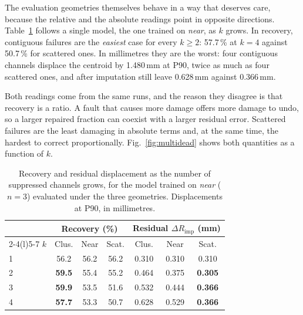 \documentclass[10pt,conference]{IEEEtran}
\begin{document}
The evaluation geometries themselves behave in a way that deserves care, because
the relative and the absolute readings point in opposite directions.
Table~\ref{tab:regimes-k} follows a single model, the one trained on
\emph{near}, as $k$ grows. In recovery, contiguous failures are the
\emph{easiest} case for every $k \ge 2$: 57.7\,\% at $k=4$ against 50.7\,\% for
scattered ones. In millimetres they are the worst: four contiguous channels
displace the centroid by 1.480\,mm at P90, twice as much as four scattered ones,
and after imputation still leave 0.628\,mm against 0.366\,mm.

Both readings come from the same runs, and the reason they disagree is that
recovery is a ratio. A fault that causes more damage offers more damage to
undo, so a larger repaired fraction can coexist with a larger residual error.
Scattered failures are the least damaging in absolute terms and, at the same
time, the hardest to correct proportionally. Fig.~\ref{fig:multidead} shows both
quantities as a function of $k$.

\begin{table}[t]
\centering
\caption{Recovery and residual displacement as the number of suppressed
channels grows, for the model trained on \emph{near} ($n=3$) evaluated under the
three geometries. Displacements at P90, in millimetres.}
\label{tab:regimes-k}
\begin{tabular}{@{}lcccccc@{}}
\toprule
& \multicolumn{3}{c}{\textbf{Recovery (\%)}}
& \multicolumn{3}{c}{\textbf{Residual $\Delta R_{\mathrm{imp}}$ (mm)}} \\
\cmidrule(lr){2-4}\cmidrule(l){5-7}
$k$ & Clus. & Near & Scat. & Clus. & Near & Scat. \\
\midrule
1 & 56.2 & 56.2 & 56.2 & 0.310 & 0.310 & 0.310 \\
2 & \textbf{59.5} & 55.4 & 55.2 & 0.464 & 0.375 & \textbf{0.305} \\
3 & \textbf{59.9} & 53.5 & 51.6 & 0.532 & 0.444 & \textbf{0.366} \\
4 & \textbf{57.7} & 53.3 & 50.7 & 0.628 & 0.529 & \textbf{0.366} \\
\bottomrule
\end{tabular}
\end{table}

\end{document}
